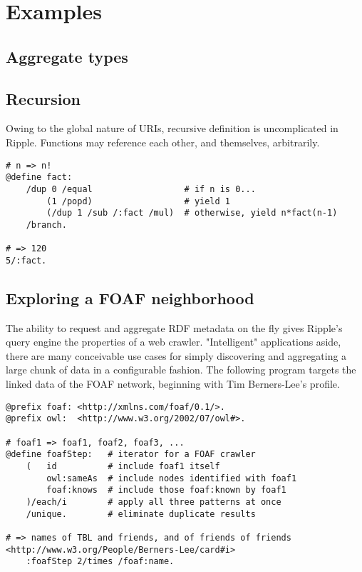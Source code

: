\documentclass[runningheads]{llncs}
\begin{document}
\section{Examples}






\subsection{Aggregate types}


\subsection{Recursion}
Owing to the global nature of URIs, recursive definition is uncomplicated in Ripple.  Functions may reference each other, and themselves, arbitrarily.
\begin{verbatim}
# n => n!
@define fact:
    /dup 0 /equal                  # if n is 0...
        (1 /popd)                  # yield 1
        (/dup 1 /sub /:fact /mul)  # otherwise, yield n*fact(n-1)
    /branch.

# => 120
5/:fact.
\end{verbatim}

\subsection{Exploring a FOAF neighborhood}

The ability to request and aggregate RDF metadata on the fly gives Ripple's query engine the properties of a web crawler.  "Intelligent" applications aside, there are many conceivable use cases for simply discovering and aggregating a large chunk of data in a configurable fashion.  The following program targets the linked data of the FOAF network, beginning with Tim Berners-Lee's profile.
\begin{verbatim}
@prefix foaf: <http://xmlns.com/foaf/0.1/>.
@prefix owl:  <http://www.w3.org/2002/07/owl#>.

# foaf1 => foaf1, foaf2, foaf3, ...
@define foafStep:   # iterator for a FOAF crawler
    (   id          # include foaf1 itself
        owl:sameAs  # include nodes identified with foaf1
        foaf:knows  # include those foaf:known by foaf1
    )/each/i        # apply all three patterns at once
    /unique.        # eliminate duplicate results

# => names of TBL and friends, and of friends of friends
<http://www.w3.org/People/Berners-Lee/card#i>
    :foafStep 2/times /foaf:name.
\end{verbatim}
\end{document}
